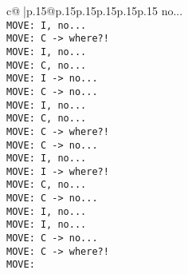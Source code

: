 \documentclass{article}
\begin{document}
{\begin{supertabular}{c@{$\;$}|p{.15\linewidth}@{}p{.15\linewidth}p{.15\linewidth}p{.15\linewidth}p{.15\linewidth}p{.15\linewidth}}
{{{ no...\\ \tt  MOVE: I, no...\\ \tt  MOVE: C -> where?!\\ \tt  MOVE: I, no...\\ \tt  MOVE: C, no...\\ \tt  MOVE: I -> no...\\ \tt  MOVE: C -> no...\\ \tt  MOVE: I, no...\\ \tt  MOVE: C, no...\\ \tt  MOVE: C -> where?!\\ \tt  MOVE: C -> no...\\ \tt  MOVE: I, no...\\ \tt  MOVE: I -> where?!\\ \tt  MOVE: C, no...\\ \tt  MOVE: C -> no...\\ \tt  MOVE: I, no...\\ \tt  MOVE: I, no...\\ \tt  MOVE: C -> no...\\ \tt  MOVE: C -> where?!\\ \tt  MOVE:}}}
\end{supertabular}}
\end{document}
